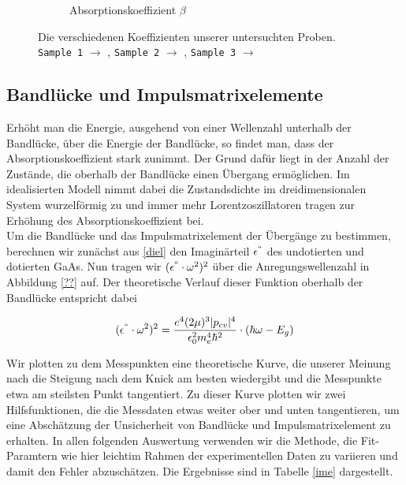 \documentclass[paper=a4,fontsize=10pt,DIV=18,twocolumn,parskip=half]{scrartcl}
\numberwithin{equation}{section}    %
\begin{document}
\begin{figure}
\begin{subfigure}{\columnwidth}
        \caption{Absorptionskoeffizient $\beta$}
        \label{ab}
    \end{subfigure}
    \caption{Die verschiedenen Koeffizienten unserer untersuchten Proben.  
    \texttt{Sample 1} $\rightarrow$ ,
    \texttt{Sample 2} $\rightarrow$ , 
    \texttt{Sample 3} $\rightarrow$ }
    \label{brechzahlen}
\end{figure}

\subsection{Bandlücke und Impulsmatrixelemente}

Erhöht man die Energie, ausgehend von einer Wellenzahl unterhalb der Bandlücke, 
über die Energie der Bandlücke, so findet man, dass der Absorptionskoeffizient 
stark zunimmt. Der Grund dafür liegt in der Anzahl der Zustände, die oberhalb 
der Bandlücke einen Übergang ermöglichen. Im idealisierten Modell nimmt dabei 
die Zustandsdichte im dreidimensionalen System wurzelförmig zu und immer mehr 
Lorentzoszillatoren tragen zur Erhöhung des Absorptionskoeffizient bei.\\
Um die Bandlücke und das Impulsmatrixelement der Übergänge zu bestimmen, 
berechnen wir zunächst aus \cref{diel} den Imaginärteil $\epsilon^{``}$ des 
undotierten und dotierten GaAs. Nun tragen wir $(\epsilon^{``}\cdot \omega^2)^2$ 
über die Anregungswellenzahl in Abbildung \ref{??} auf. Der theoretische Verlauf 
dieser Funktion oberhalb der Bandlücke entspricht dabei

\begin{align}
   (\epsilon^{``}\cdot \omega^2)^2=\frac{e^4 (2\mu)^3 |p_{cv}|^4}{\epsilon_0^2 
   m_e^4 \hbar^2} \cdot (\hbar \omega - E_g)
\end{align}

Wir plotten zu dem Messpunkten eine theoretische Kurve, die unserer Meinung nach 
die Steigung nach dem Knick am besten wiedergibt und die Messpunkte etwa am 
steilsten Punkt tangentiert. Zu dieser Kurve plotten wir zwei Hilfsfunktionen, 
die die Messdaten etwas weiter ober und unten tangentieren, um eine Abschätzung 
der Unsicherheit von Bandlücke und Impulsmatrixelement zu erhalten. In allen 
folgenden Auswertung verwenden wir die Methode, die Fit-Paramtern wie hier leichtim Rahmen der experimentellen Daten zu variieren und damit den Fehler abzuschätzen.
Die Ergebnisse sind in Tabelle \ref{ime} dargestellt.
\end{document}
